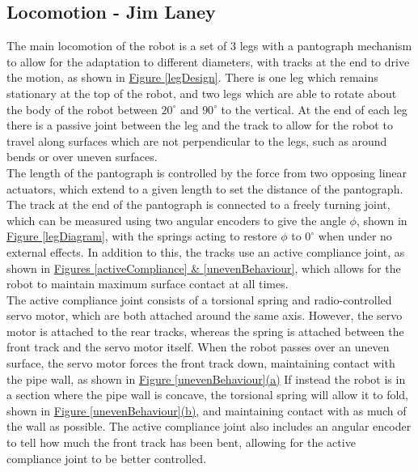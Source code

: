 \documentclass[11pt]{article}		%
\newcommand{\figref}[1]{\hyperref[#1]{Figure \ref*{#1}}}    %
\begin{document}
		\subsection[Locomotion]{Locomotion - Jim Laney}
			
			The main locomotion of the robot is a set of 3 legs with a pantograph mechanism  to allow for the adaptation to different diameters, with tracks at the end to drive the motion, as shown in \figref{legDesign}.
			There is one leg which remains stationary at the top of the robot, and two legs which are able to rotate about the body of the robot between $20^\circ$ and $90^\circ$ to the vertical.
			At the end of each leg there is a passive joint between the leg and the track to allow for the robot to travel along surfaces which are not perpendicular to the legs, such as around bends or over uneven surfaces.
			\\
			The length of the pantograph is controlled by the force from two opposing linear actuators, which extend to a given length to set the distance of the pantograph.
			The track at the end of the pantograph is connected to a freely turning joint, which can be measured using two angular encoders to give the angle $\phi$, shown in \figref{legDiagram}, with the springs acting to restore $\phi$ to $0^\circ$ when under no external effects.
			In addition to this, the tracks use an active compliance joint, as shown in \hyperref[activeCompliance]{Figures \ref*{activeCompliance} \& \ref*{unevenBehaviour}}, which allows for the robot to maintain maximum surface contact at all times.
			\\
			The active compliance joint consists of a torsional spring and radio-controlled servo motor, which are both attached around the same axis.
			However, the servo motor is attached to the rear tracks, whereas the spring is attached between the front track and the servo motor itself.
			When the robot passes over an uneven surface, the servo motor forces the front track down, maintaining contact with the pipe wall, as shown in \hyperref[unevenBehaviour]{Figure \ref*{unevenBehaviour}(a)}
			If instead the robot is in a section where the pipe wall is concave, the torsional spring will allow it to fold, shown in \hyperref[unevenBehaviour]{Figure \ref*{unevenBehaviour}(b)}, and maintaining contact with as much of the wall as possible.
			The active compliance joint also includes an angular encoder to tell how much the front track has been bent, allowing for the active compliance joint to be better controlled.
\end{document}
